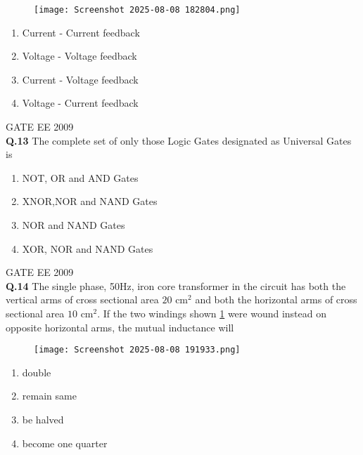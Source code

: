 \documentclass[12pt]{article}
\begin{document}
\begin{figure}[h]

    \centering
    \texttt{[image: Screenshot 2025-08-08 182804.png]}
\end{figure}

\begin{enumerate}
    \item Current - Current feedback
    \item Voltage - Voltage feedback
    \item Current - Voltage feedback
    \item Voltage - Current feedback
\end{enumerate}

\vspace{0.5cm}
\hspace{10pt}
GATE EE 2009\\

\noindent\textbf{Q.13} The complete set of only those Logic Gates designated as Universal Gates is
\begin{enumerate}
     \item NOT, OR and AND Gates
     \item XNOR,NOR and NAND Gates
     \item NOR and NAND Gates
     \item XOR,  NOR and NAND Gates
\end{enumerate}

\vspace{0.5cm}
\hspace{10pt}
GATE EE 2009 \\
\noindent\textbf{Q.14} The single phase, 50Hz, iron core transformer in the circuit has both the vertical arms of cross sectional area $20\text{ cm}^2$ and both the horizontal arms of cross sectional area $10\text{ cm}^2$. If the two windings shown \ref{fig:2} were wound instead on opposite horizontal arms, the mutual inductance will
\begin{figure}[h]
    \centering
    \texttt{[image: Screenshot 2025-08-08 191933.png]}
    \label{fig:2}
\end{figure}

\begin{enumerate}
    \item double
     \item remain same
     \item be halved
     \item become one quarter
\end{enumerate}
\end{document}
